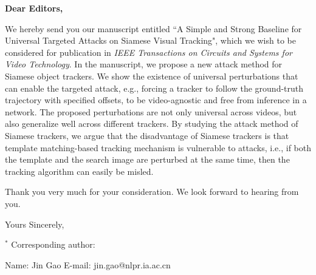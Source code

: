 \addtolength{\voffset}{-0.5in}
\addtolength{\hoffset}{-0.3in}
\addtolength{\textheight}{2cm}

\signature{Zhenbang Li, Yaya Shi, Jin Gao$^*$, Shaoru Wang, Bing Li, Pengpeng Liang, Weiming Hu}
            
\begin{letter}{}
\opening{\textbf{Dear Editors,}}

We hereby send you our manuscript entitled ``A Simple and Strong Baseline for Universal Targeted Attacks on Siamese Visual Tracking", which we wish to be considered for publication in \textit{IEEE Transactions on Circuits and Systems for Video Technology}. In the manuscript, we propose a new attack method for Siamese object trackers. 
We show the existence of universal perturbations that can enable the targeted attack, e.g., forcing a tracker to follow the ground-truth trajectory with specified offsets, to be video-agnostic and free from inference in a network.
The proposed perturbations are not only universal across videos, but also generalize well across different trackers. 
By studying the attack method of Siamese trackers, we argue that the disadvantage of Siamese trackers is that template matching-based tracking mechanism is vulnerable to attacks, i.e., if both the template and the search image are perturbed at the same time, then the tracking algorithm can easily be misled.

Thank you very much for your consideration. We look forward to hearing from you.
 


\vspace{2\parskip}
\closing{Yours Sincerely,}
\vspace{5mm}
$^*$ Corresponding author:
\vspace{-2mm}

Name: Jin Gao   \quad\quad  E-mail: jin.gao@nlpr.ia.ac.cn
\end{letter}



